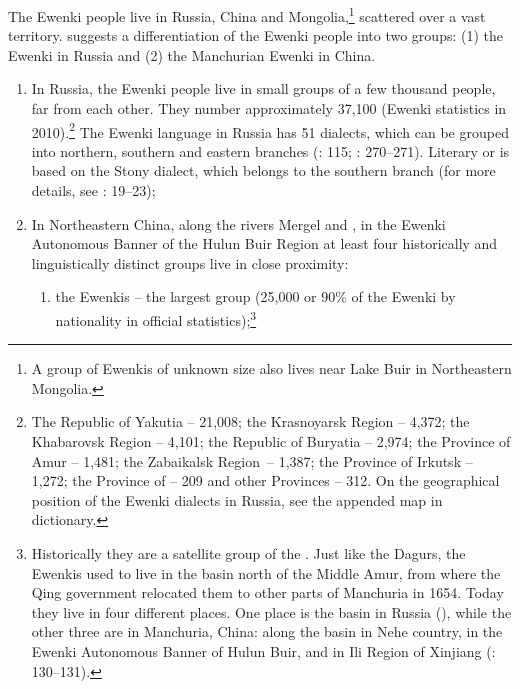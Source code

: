\documentclass[output=paper,colorlinks,citecolor=brown]{langscibook}
\begin{document}
The Ewenki people live in Russia, China and Mongolia,\footnote{A group of Ewenkis of unknown size also lives near Lake Buir in Northeastern Mongolia.} scattered over a vast territory. \citet[130]{Janhunen1997} suggests a differentiation of the Ewenki people into two groups: (1) the  Ewenki in Russia and (2) the Manchurian Ewenki in China.

\begin{enumerate}
    \item In Russia, the Ewenki people live in small groups of a few thousand people, far from each other. They number approximately 37,100 (Ewenki statistics in 2010).\footnote{The Republic of Yakutia – 21,008; the Krasnoyarsk Region – 4,372; the Khabarovsk Region – 4,101; the Republic of Buryatia – 2,974; the Province of Amur – 1,481; the Zabaikalsk Region~– 1,387; the Province of Irkutsk – 1,272; the Province of  – 209 and other Provinces – 312. On the geographical position of the Ewenki dialects in Russia, see the appended map in  dictionary.} The Ewenki language in Russia has 51 dialects, which can be grouped into northern, southern and eastern branches (\citealt{Atknine1997}: 115; \citealt{Bulatova2002}: 270--271). Literary or  is based on the Stony  dialect, which belongs to the southern branch (for more details, see \citealt{Khabtagaeva2017}: 19--23);
    
    \item In Northeastern China, along the rivers Mergel and , in the Ewenki Autonomous Banner of the Hulun Buir Region at least four historically and linguistically distinct groups live in close proximity:

\begin{enumerate}
    \item the  Ewenkis – the largest group (25,000 or 90\% of the Ewenki by nationality in official statistics);\footnote{Historically they are a satellite group of the . Just like the Dagurs, the  Ewenkis used to live in the  basin north of the Middle Amur, from where the Qing government relocated them to other parts of Manchuria in 1654. Today they live in four different places. One place is the  basin in Russia (\citealt{Bulatova1987}), while the other three are in Manchuria, China: along the  basin in Nehe country, in the Ewenki Autonomous Banner of Hulun Buir, and in Ili Region of Xinjiang (\citealt{Janhunen1997}: 130--131).}
    

\end{enumerate}
\end{enumerate}
\end{document}
